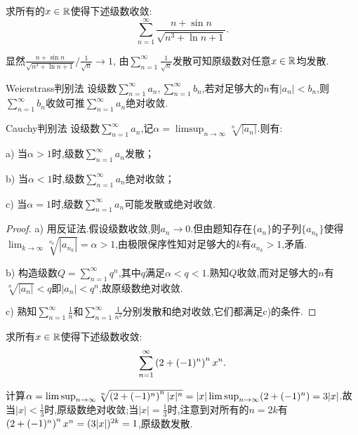 \begin{example}
	求所有的$x \in \mathbb{R}$使得下述级数收敛: $$\sum_{n=1}^{\infty} \frac{n+\sin n}{\sqrt{n^3+\ln n +1}}. $$
\end{example}
\begin{solution}
	显然$\frac{n+\sin n}{\sqrt{n^3+\ln n +1}} / \frac{1}{\sqrt{n}} \to 1$, 由$\sum_{n=1}^{\infty} \frac{1}{\sqrt{n}}$发散可知原级数对任意$x \in \mathbb{R}$均发散. 
\end{solution}

\begin{corollary}{Weierstrass判别法}
	设级数$\sum_{n=1}^{\infty} a_n,\sum_{n=1}^{\infty} b_n$,若对足够大的$n$有$|a_n|<b_n$,则$\sum_{n=1}^{\infty} b_n$收敛可推$\sum_{n=1}^{\infty} a_n$绝对收敛.
\end{corollary}

\begin{proposition}{Cauchy判别法}
	设级数$\sum_{n=1}^{\infty} a_n$,记$\alpha = \limsup_{n\to \infty} \sqrt[n]{|a_n|}$.则有:
	
	a) 当$\alpha >1$时,级数$\sum_{n=1}^{\infty} a_n$发散；
	
	b) 当$\alpha <1$时,级数$\sum_{n=1}^{\infty} a_n$绝对收敛；
	
	c) 当$\alpha =1$时,级数$\sum_{n=1}^{\infty} a_n$可能发散或绝对收敛.
\end{proposition}
\begin{proof}
	a) 用反证法.假设级数收敛,则$a_n \to 0$.但由题知存在$\{ a_n \}$的子列$\{ a_{n_k} \}$使得$\lim_{k\to \infty} \sqrt[n_k]{|a_{n_k}|} = \alpha > 1$,由极限保序性知对足够大的$k$有$a_{n_k}>1$,矛盾.
	
	b) 构造级数$Q=\sum_{n=1}^{\infty} q^n$,其中$q$满足$\alpha < q <1$.熟知$Q$收敛,而对足够大的$n$有$\sqrt[n]{|a_n|}<q$即$|a_n|<q^n$,故原级数绝对收敛.
	
	c) 熟知$\sum_{n=1}^{\infty} \frac{1}{n}$和$\sum_{n=1}^{\infty} \frac{1}{n^2}$分别发散和绝对收敛,它们都满足c)的条件.
\end{proof}

\begin{example}
	求所有$x \in \mathbb{R}$使得下述级数收敛:$$\sum_{n=1}^{\infty} \left( 2+(-1)^n \right)^n x^n.$$
\end{example}
\begin{solution}
	计算$\alpha = \limsup_{n\to \infty} \sqrt[n]{\left( 2+(-1)^n \right)^n |x|^n}= |x|\limsup_{n\to \infty} (2+(-1)^n)=3|x|$.故当$|x|<\frac{1}{3}$时,原级数绝对收敛;当$|x|=\frac{1}{3}$时,注意到对所有的$n=2k$有$\left( 2+(-1)^n \right)^n x^n = (3|x|)^{2k}=1$,原级数发散.
\end{solution}

